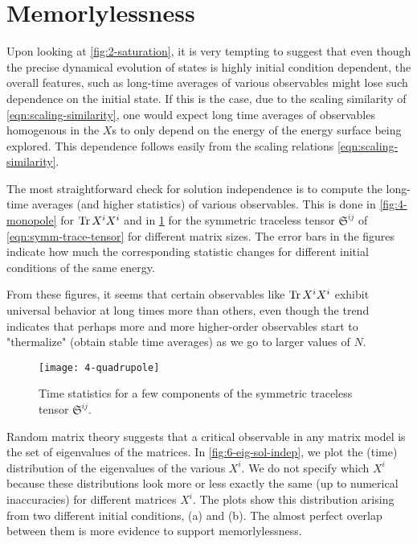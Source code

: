 \section{Memorlylessness}

Upon looking at \cref{fig:2-saturation}, it is very tempting to suggest that even though the precise dynamical evolution of states is highly initial condition dependent, the overall features, such as long-time averages of various observables might lose such dependence on the initial state. If this is the case, due to the scaling similarity of \cref{eqn:scaling-similarity}, one would expect long time averages of observables homogenous in the $X$s to only depend on the energy of the energy surface being explored. This dependence follows easily from the scaling relations \cref{eqn:scaling-similarity}.

The most straightforward check for solution independence is to compute the long-time averages (and higher statistics) of various observables. This is done in \cref{fig:4-monopole} for $\Tr X^i X^i$ and in \cref{fig:4-quadrupole} for the symmetric traceless tensor $\mathfrak{S}^{i j}$ of \cref{eqn:symm-trace-tensor} for different matrix sizes. The error bars in the figures indicate how much the corresponding statistic changes for different initial conditions of the same energy.

From these figures, it seems that certain observables like $\Tr X^i X^i$ exhibit universal behavior at long times more than others, even though the trend indicates that perhaps more and more higher-order observables start to "thermalize" (obtain stable time averages) as we go to larger values of $N$. 




\begin{figure}[H]
    \centering
    \texttt{[image: 4-quadrupole]}
    \caption{Time statistics for a few components of the symmetric traceless tensor $\mathfrak{S}^{i j}$.}
    \label{fig:4-quadrupole}
\end{figure}

Random matrix theory suggests that a critical observable in any matrix model is the set of eigenvalues of the matrices. In \cref{fig:6-eig-sol-indep}, we plot the (time) distribution of the eigenvalues of the various $X^i$. We do not specify which $X^i$ because these distributions look more or less exactly the same (up to numerical inaccuracies) for different matrices $X^i$. The plots show this distribution arising from two different initial conditions, (a) and (b). The almost perfect overlap between them is more evidence to support memorlylessness.

